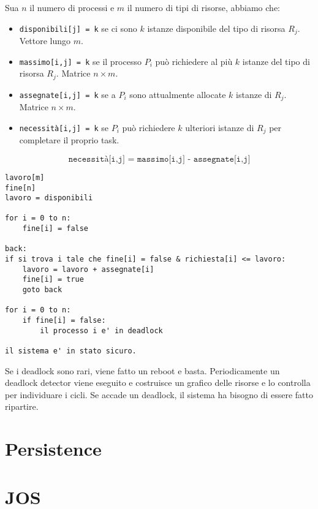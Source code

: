\documentclass[12pt, letterpaper]{article}
\begin{document}
				Sua $n$ il numero di processi e $m$ il numero di tipi di risorse, abbiamo che:
				\begin{itemize}
					\item \texttt{disponibili[j] = k} se ci sono $k$ istanze disponibile del tipo di risorsa $R_j$. Vettore lungo $m$.
					\item \texttt{massimo[i,j] = k} se il processo $P_i$ può richiedere al più $k$ istanze del tipo di risorsa $R_j$. Matrice $n \times m$.
					\item \texttt{assegnate[i,j] = k} se a $P_i$ sono attualmente allocate $k$ istanze di $R_j$. Matrice $n \times m$.
					\item \texttt{necessità[i,j] = k} se $P_i$ può richiedere $k$ ulteriori istanze di $R_j$ per completare il proprio task. 
				\end{itemize}
				$$\texttt{necessità[i,j] = massimo[i,j] - assegnate[i,j]}$$
				
				\begin{lstlisting}[style=CStyle]
lavoro[m]
fine[n]
lavoro = disponibili

for i = 0 to n:
	fine[i] = false

back:
if si trova i tale che fine[i] = false & richiesta[i] <= lavoro:
	lavoro = lavoro + assegnate[i]
	fine[i] = true
	goto back
	
for i = 0 to n:
	if fine[i] = false:
		il processo i e' in deadlock

il sistema e' in stato sicuro.				\end{lstlisting}
				Se i deadlock sono rari, viene fatto un reboot e basta. Periodicamente un deadlock detector viene eseguito e costruisce un grafico delle risorse e lo controlla per individuare i cicli. Se accade un deadlock, il sistema ha bisogno di essere fatto ripartire.


				

				
			
\newpage	\section{Persistence}


	\section{JOS}
\end{document}
